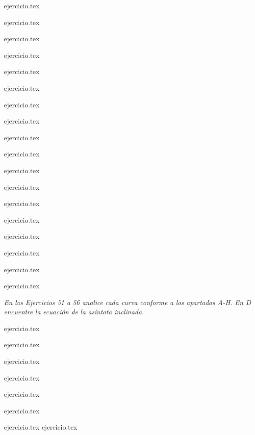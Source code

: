 \begin{enumerate}
\begin{minipage}{0.45\textwidth}
    {ejercicio.tex}
    \addtocounter{enumi}{1}
    {ejercicio.tex}
    \addtocounter{enumi}{1}
    {ejercicio.tex}
    \addtocounter{enumi}{1}
    {ejercicio.tex}
    \addtocounter{enumi}{1}
    {ejercicio.tex}
    \addtocounter{enumi}{1}
    {ejercicio.tex}
    \addtocounter{enumi}{1}
    {ejercicio.tex}
    \addtocounter{enumi}{1}
    {ejercicio.tex}
    \addtocounter{enumi}{1}
    {ejercicio.tex}
    \addtocounter{enumi}{1}
    {ejercicio.tex}
    \addtocounter{enumi}{1}
    {ejercicio.tex}
    \end{minipage}
\end{enumerate}

\vspace{1em}
\begin{enumerate}
    \setcounter{enumi}{43}
    \begin{minipage}{0.45\textwidth}
    {ejercicio.tex}
    \addtocounter{enumi}{1}
    {ejercicio.tex}
    \addtocounter{enumi}{1}
    {ejercicio.tex}
    \end{minipage}%
    \begin{minipage}{0.45\textwidth}
    \setcounter{enumi}{43}
    {ejercicio.tex}
    \addtocounter{enumi}{1}
    {ejercicio.tex}
    \addtocounter{enumi}{1}
    {ejercicio.tex}
    \addtocounter{enumi}{1}
    {ejercicio.tex}
    \end{minipage}
\end{enumerate}

\vspace{1em}
\noindent \textit{En los Ejercicios 51 a 56 analice cada curva conforme a los apartados A-H. En D encuentre la ecuación de la asíntota inclinada.}

\begin{enumerate}
    \setcounter{enumi}{50}
    \begin{minipage}{0.45\textwidth}
    {ejercicio.tex}
    \addtocounter{enumi}{1}
    {ejercicio.tex}
    \addtocounter{enumi}{1}
    {ejercicio.tex}
    \end{minipage}%
    \begin{minipage}{0.45\textwidth}
    \setcounter{enumi}{51}
    {ejercicio.tex}
    \addtocounter{enumi}{1}
    {ejercicio.tex}
    \addtocounter{enumi}{1}
    {ejercicio.tex}
    \end{minipage}
\end{enumerate}

\vspace{1em}
\begin{enumerate}
    \setcounter{enumi}{56}
    {ejercicio.tex}
    {ejercicio.tex}
\end{enumerate}
